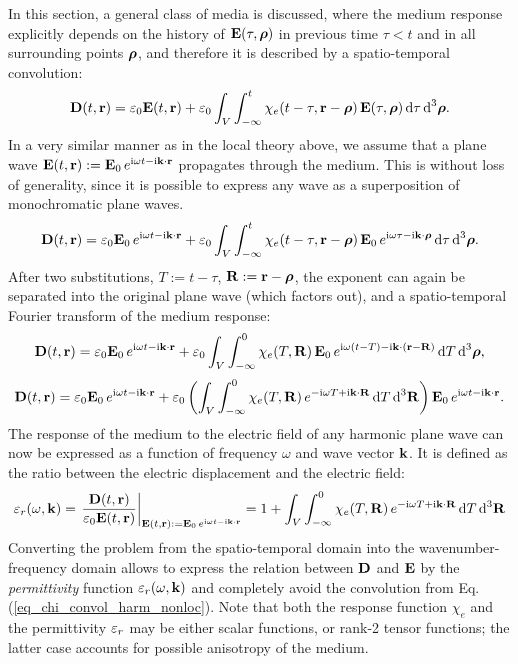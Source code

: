 In this section, a general class of media is discussed, where the medium response explicitly depends on the history of $\mathbf{E}(\tau, \boldsymbol{\rho})$ in previous time $\tau < t$ and in all surrounding points $\boldsymbol{\rho}$, and therefore it is described by a spatio-temporal convolution:
\begin{equation} \mathbf{D}(t,{\mathbf{r}}) = \varepsilon_0 \mathbf{E}(t,{\mathbf{r}}) + \varepsilon_0\int_{V} \int_{-\infty}^{t} \chi_e(t-\tau, {\mathbf{r}}-\boldsymbol{\rho}) \, \mathbf{E}(\tau,\boldsymbol{\rho}) \,\mbox{d}\tau \,\mbox{d}^3\boldsymbol{\rho}. \label{eq_chi_convol_nonloc}\end{equation}
In a very similar manner as in the local theory above, we assume that a plane wave $\mathbf{E}(t, {\mathbf{r}}) := \mathbf{E}_0 \, e^{{\mathrm i}\omega t - {\mathrm i}{\mathbf{k}}\cdot{\mathbf{r}}}$ propagates through the medium. This is without loss of generality, since it is possible to express any wave as a superposition of monochromatic plane waves.
\begin{equation} \mathbf{D}(t,{\mathbf{r}}) = \varepsilon_0 \mathbf{E}_0 \, e^{{\mathrm i}\omega t - {\mathrm i}{\mathbf{k}}\cdot{\mathbf{r}}} + \varepsilon_0\int_{V} \int_{-\infty}^{t} \chi_e(t-\tau, {\mathbf{r}}-\boldsymbol{\rho}) \, \mathbf{E}_0 \, e^{{\mathrm i}\omega \tau - {\mathrm i}{\mathbf{k}}\cdot\boldsymbol{\rho}} \,\mbox{d}\tau \,\mbox{d}^3\boldsymbol{\rho}. \label{eq_chi_convol_harm_nonloc}\end{equation}
After two  substitutions, $T:=t-\tau$, $\mathbf{R}:={\mathbf{r}}-\boldsymbol{\rho}$, the exponent can again be separated into the original plane wave (which factors out), and a spatio-temporal Fourier transform of the medium response:
$$				 \mathbf{D}(t,{\mathbf{r}}) = \varepsilon_0 \mathbf{E}_0 \, e^{{\mathrm i}\omega t - {\mathrm i}{\mathbf{k}}\cdot{\mathbf{r}}} + \varepsilon_0\int_{V} \int_{-\infty}^{0} \chi_e(T, \mathbf{R}) \, \mathbf{E}_0 \, e^{{\mathrm i}\omega (t - T) - {\mathrm i}{\mathbf{k}}\cdot({\mathbf{r}} - \mathbf{R})} \,\mbox{d}T \,\mbox{d}^3\boldsymbol{\rho},$$
$$				 \mathbf{D}(t,{\mathbf{r}}) = \varepsilon_0 \mathbf{E}_0 \, e^{{\mathrm i}\omega t - {\mathrm i}{\mathbf{k}}\cdot{\mathbf{r}}} + \varepsilon_0\left( \int_{V} \int_{-\infty}^{0} \chi_e(T, \mathbf{R})  \, e^{-{\mathrm i}\omega T + {\mathrm i}{\mathbf{k}}\cdot \mathbf{R}}\,\mbox{d}T \,\mbox{d}^3 \mathbf{R} \right) \mathbf{E}_0 \, e^{{\mathrm i}\omega t - {\mathrm i}{\mathbf{k}}\cdot{\mathbf{r}}}.$$
The response of the medium to the electric field of any harmonic plane wave can now be expressed as a function of frequency $\omega$ and wave vector ${\mathbf{k}}$. It is defined as the ratio between the electric displacement and the electric field:
\begin{equation} \varepsilon_r(\omega, {\mathbf{k}}) = \left.\frac{\mathbf{D}(t,{\mathbf{r}})}{\varepsilon_0 \mathbf{E}(t,{\mathbf{r}})} \right|_{\mathbf{E}(t, {\mathbf{r}}) := \mathbf{E}_0 \, e^{{\mathrm i}\omega t - {\mathrm i}{\mathbf{k}}\cdot{\mathbf{r}}}}  = 1 + \int_{V} \int_{-\infty}^{0} \chi_e(T, \mathbf{R}) \,e^{-{\mathrm i}\omega T + {\mathrm i}{\mathbf{k}}\cdot \mathbf{R}} \,\mbox{d}T \,\mbox{d}^3\mathbf{R} \label{eq_eps_nonloc}\end{equation}
Converting the problem from the spatio-temporal domain into the wavenumber-frequency domain allows to express the relation between $\mathbf{D}$ and $\mathbf{E}$ by the \textit{permittivity} function $\varepsilon_r(\omega, {\mathbf{k}})$ and completely avoid the convolution from Eq. (\ref{eq_chi_convol_harm_nonloc}). Note that both the response function $\chi_e$ and the permittivity $\varepsilon_r$ 
may be either scalar functions, or rank-2 tensor functions; the latter case accounts for possible anisotropy of the medium.

